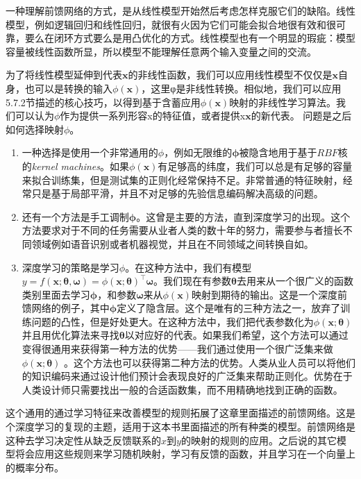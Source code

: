 一种理解前馈网络的方式，是从线性模型开始然后考虑怎样克服它们的缺陷。线性模型，例如逻辑回归和线性回归，就很有火因为它们可能会拟合地很有效和很可靠，要么在闭环方式要么是用凸优化的方式。线性模型也有一个明显的瑕疵：模型容量被线性函数所显，所以模型不能理解任意两个输入变量之间的交流。

为了将线性模型延伸到代表$\bm{x}$的非线性函数，我们可以应用线性模型不仅仅是$\bm{x}$自身，也可以是转换的输入$\phi(\bm{x})$，这里φ是非线性转换。相似地，我们可以应用5.7.2节描述的核心技巧，以得到基于含蓄应用$\phi(\bm{x})$映射的非线性学习算法。我们可以认为$\phi$作为提供一系列形容x的特征值，或者提供x$\bm{x}$的新代表。
问题是之后如何选择映射$\phi$。
\begin{enumerate}
\item 一种选择是使用一个非常通用的$\phi$，例如无限维的$\bm{\phi}$被隐含地用于基于$RBF$核的\emph{kernel machines}。如果$\phi(\bm{x})$有足够高的纬度，我们可以总是有足够的容量来拟合训练集，但是测试集的正则化经常保持不足。非常普通的特征映射，经常只是基于局部平滑，并且不对足够的先验信息编码解决高级的问题。
\item 还有一个方法是手工调制$\bm{\phi}$。这曾是主要的方法，直到深度学习的出现。这个方法要求对于不同的任务需要从业者人类的数十年的努力，需要参与者擅长不同领域例如语音识别或者机器视觉，并且在不同领域之间转换自如。
\item 深度学习的策略是学习$\phi$。在这种方法中，我们有模型$y=f(\bm{x};\bm{\theta}, \bm{\omega})=\phi(\bm{x}; \bm{\theta})^\top \bm{\omega}$。我们现在有参数$\bm{\theta}$去用来从一个很广义的函数类别里面去学习$\bm{\phi}$，和参数$\bm{\omega}$来从$\phi(\bm{x})$映射到期待的输出。这是一个深度前馈网络的例子，其中$\bm{\phi}$定义了隐含层。这个是唯有的三种方法之一，放弃了训练问题的凸性，但是好处更大。在这种方法中，我们把代表参数化为$\phi(\bm{x};\bm{\theta})$并且用优化算法来寻找$\bm{\theta}$以对应好的代表。如果我们希望，这个方法可以通过变得很通用来获得第一种方法的优势——我们通过使用一个很广泛集来做$\phi(\bm{x};\bm{\theta})$ 。这个方法也可以获得第二种方法的优势。人类从业人员可以将他们的知识编码来通过设计他们预计会表现良好的广泛集来帮助正则化。优势在于人类设计师只需要找出一般的合适函数集，而不用精确地找到正确的函数。
\end{enumerate}

这个通用的通过学习特征来改善模型的规则拓展了这章里面描述的前馈网络。这是个深度学习的复现的主题，适用于这本书里面描述的所有种类的模型。前馈网络是这种去学习决定性从缺乏反馈联系的$x$到$y$的映射的规则的应用。之后说的其它模型将会应用这些规则来学习随机映射，学习有反馈的函数，并且学习在一个向量上的概率分布。

